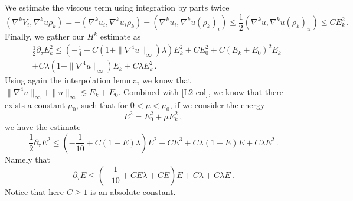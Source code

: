 \documentclass[12pt]{caltech_thesis}
\numberwithin{equation}{section}
\begin{document}
We estimate the viscous term using integration by parts twice
\begin{equation*}
(\nabla^kV_i,\nabla^ku\rho_k)= - (\nabla^ku_i,\nabla^ku_i\rho_k)-(\nabla^ku_i,\nabla^ku(\rho_k)_i)\leq\frac{1}{2}(\nabla^ku,\nabla^ku(\rho_k)_{ii})\leq CE_k^2\,.
\end{equation*}
Finally, we gather our $H^k$ estimate as
\begin{equation}
\begin{aligned}
\label{Hk-col}
    &\frac{1}{2}\partial_\tau E^2_k\leq (-\frac{1}{4}+C(1+\|\nabla^4u\|_{\infty})\lambda)E_k^2+CE_0^2+C(E_k+E_0)^2 E_k\\&+C\lambda(1+\|\nabla^4u\|_{\infty}) E_k+C\lambda E_k^2\,.
    \end{aligned}
\end{equation}
Using again the interpolation lemma, we know that $\|\nabla^4u\|_{\infty}+\|u\|_{\infty}\lesssim E_k+E_0$.
Combined with \eqref{L2-col}, we know that there exists a constant $\mu_0$, such that for $0<\mu<\mu_0$, if we consider the energy \begin{equation}\label{def_energy}
    E^2=E_0^2+\mu E_k^2\,,
\end{equation} we have the estimate 
\begin{equation*}
    \frac{1}{2}\partial_\tau E^2\leq(-\frac{1}{10}+C(1+E)\lambda)E^2+CE^3+C\lambda (1+E)E+C\lambda E^2\,.
\end{equation*}
Namely that \begin{equation}\label{energy}\partial_\tau E\leq(-\frac{1}{10}+CE\lambda+CE)E+C\lambda +C\lambda E\,.\end{equation}
Notice that here $C\geq1$ is an absolute constant.
\end{document}
